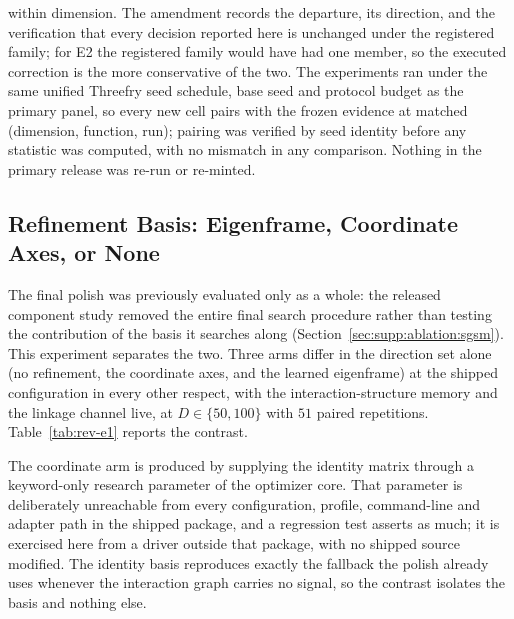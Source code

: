 \documentclass[algorithms,article,submit,moreauthors,pdftex]{Definitions/mdpi}
\begin{document}
within dimension.  The amendment records the departure, its direction, and
the verification that every decision reported here is unchanged under the
registered family; for E2 the registered family would have had one member,
so the executed correction is the more conservative of the two.
The experiments ran under the same
unified Threefry seed schedule, base seed and protocol budget as the primary
panel, so every new cell pairs with the frozen evidence at matched
(dimension, function, run); pairing was verified by seed identity before any
statistic was computed, with no mismatch in any comparison.  Nothing in the
primary release was re-run or re-minted.

\subsection{Refinement Basis: Eigenframe, Coordinate Axes, or None}\label{sec:supp:rev:basis}

The final polish was previously evaluated only as a whole: the released
component study removed the entire final search procedure rather than testing
the contribution of the basis it searches along
(Section~\ref{sec:supp:ablation:sgsm}).  This experiment separates the two.
Three arms differ in the direction set alone (no refinement, the coordinate
axes, and the learned eigenframe) at the shipped configuration in every
other respect, with the interaction-structure memory and the linkage channel
live, at $D \in \{50, 100\}$ with $51$ paired repetitions.
Table~\ref{tab:rev-e1} reports the contrast.

The coordinate arm is produced by supplying the identity matrix through a
keyword-only research parameter of the optimizer core.  That parameter is
deliberately unreachable from every configuration, profile, command-line and
adapter path in the shipped package, and a regression test asserts as much;
it is exercised here from a driver outside that package, with no shipped
source modified.  The identity basis reproduces exactly the fallback the polish
already uses whenever the interaction graph carries no signal, so the contrast
isolates the basis and nothing else.
\end{document}
